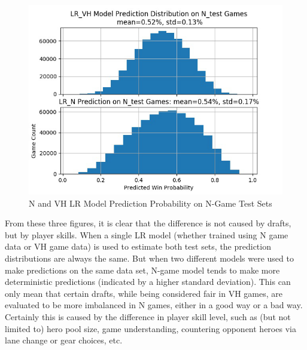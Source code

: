 \documentclass{article}
\begin{document}
\begin{appendix}
\begin{figure}[htb]
 \centering 
 \includegraphics[scale=0.8]{Picture5.png}
 \caption{N and VH LR Model Prediction Probability on N-Game Test Sets}
 \label{image:pic5}
\end{figure}
From these three figures, it is clear that the difference is not caused by drafts, but by player skills. When a single LR model (whether trained using N game data or VH game data) is used to estimate both test sets, the prediction distributions are always the same. But when two different models were used to make predictions on the same data set, N-game model tends to make more deterministic predictions (indicated by a higher standard deviation). This can only mean that certain drafts, while being considered fair in VH games, are evaluated to be more imbalanced in N games, either in a good way or a bad way. Certainly this is caused by the difference in player skill level, such as (but not limited to) hero pool size, game understanding, countering opponent heroes via lane change or gear choices, etc.

\end{appendix}
\end{document}
